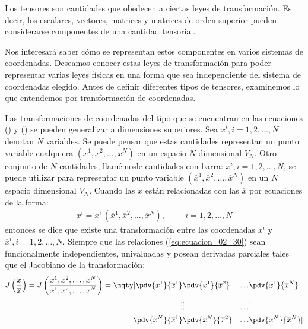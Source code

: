 Los tensores son cantidades que obedecen a ciertas leyes de transformación. Es decir, los escalares, vectores, matrices y matrices de orden superior pueden considerarse componentes de una cantidad tensorial.
\par
Nos interesará saber cómo se representan estos componentes en varios sistemas de coordenadas. Deseamos conocer estas leyes de transformación para poder representar varias leyes físicas en una forma que sea independiente del sistema de coordenadas elegido. Antes de definir diferentes tipos de tensores, examinemos lo que entendemos por transformación de coordenadas.
\par
Las transformaciones de coordenadas del tipo que se encuentran en las ecuaciones () y () se pueden generalizar a dimensiones superiores. Sea $x^{i}, i = 1, 2,\ldots, N$ denotan $N$ variables. Se puede pensar que estas cantidades representan un punto variable cualquiera $(x^{1}, x^{2}, \ldots, x^{N})$ en un espacio $N$ dimensional $V_{N}$. Otro conjunto de $N$ cantidades, llamémosle cantidades con barra: $\overline{x}^{i}, i = 1,2, \ldots, N$, se puede utilizar para representar un punto variable $(\overline{x}^{1}, \overline{x}^{2}, \ldots, \overline{x}^{N})$ en un $N$ espacio dimensional $\overline{V}_{N}$. Cuando las $x$ están relacionadas con las $\overline{x}$ por ecuaciones de la forma:
\begin{align}
x^{i} = x^{i} \, (\overline{x}^{1}, \overline{x}^{2}, \ldots, \overline{x}^{N}), \hspace{1cm} i = 1, 2, \ldots, N
\label{eq:ecuacion_02_30}
\end{align}
entonces se dice que existe una transformación entre las coordenadas $x^{i}$ y $\overline{x}^{i}, i = 1, 2, \ldots, N$. Siempre que las relaciones (\ref{eq:ecuacion_02_30}) sean funcionalmente independientes, univaluadas y posean derivadas parciales tales que el Jacobiano de la transformación:
\begin{align}
J \left( \dfrac{x}{\overline{x}} \right) = J \left( \dfrac{x^{1}, x^{2}, \ldots, x^{N}}{\overline{x}^{1}, \overline{x}^{2}, \ldots, \overline{x}^N} \right) = \mqty|
\displaystyle \pdv{x^{1}}{\overline{x}^{1}} & \displaystyle \pdv{x^{1}}{\overline{x}^{2}} & \ldots & \displaystyle \pdv{x^{1}}{\overline{x}^{N}} \\
\vdots & \vdots & \ldots & \vdots \\
\displaystyle \pdv{x^{N}}{\overline{x}^{1}} & \displaystyle \pdv{x^{N}}{\overline{x}^{2}} & \ldots & \displaystyle \pdv{x^{N}}{\overline{x}^{N}} |
\label{ec:ecuacion_02_31}
\end{align}
